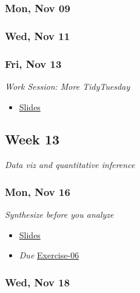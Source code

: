 \documentclass[
  letterpaper,
  DIV=11,
  numbers=noendperiod]{scrartcl}
\providecommand{\tightlist}{%
  \setlength{\itemsep}{0pt}\setlength{\parskip}{0pt}}
\begin{document}
\subsubsection*{Mon, Nov 09}\label{mon-nov-09}

\subsubsection*{Wed, Nov 11}\label{wed-nov-11}

\subsubsection*{Fri, Nov 13}\label{fri-nov-13}

\emph{Work Session: More TidyTuesday}

\begin{itemize}
\tightlist
\item
  \href{404.qmd}{Slides}
\end{itemize}

\subsection*{Week 13}\label{week-13}

\emph{Data viz and quantitative inference}

\subsubsection*{Mon, Nov 16}\label{mon-nov-16}

\emph{Synthesize before you analyze}

\begin{itemize}
\tightlist
\item
  \href{404.qmd}{Slides}
\item
   \emph{Due}
  \href{exercises/ex-06-tbd.qmd}{Exercise-06}
\end{itemize}

\subsubsection*{Wed, Nov 18}\label{wed-nov-18}
\end{document}
